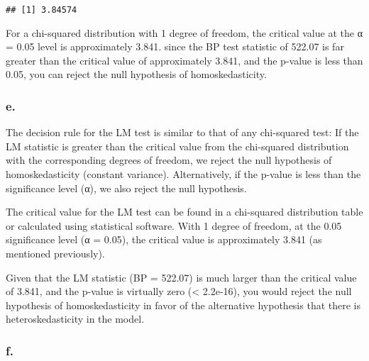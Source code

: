 \documentclass[
]{article}
\begin{document}
\begin{verbatim}
## [1] 3.84574
\end{verbatim}

For a chi-squared distribution with 1 degree of freedom, the critical
value at the α = 0.05 level is approximately 3.841. since the BP test
statistic of 522.07 is far greater than the critical value of
approximately 3.841, and the p-value is less than 0.05, you can reject
the null hypothesis of homoskedasticity.

\hypertarget{e.}{%
\subsubsection{e.}\label{e.}}

The decision rule for the LM test is similar to that of any chi-squared
test: If the LM statistic is greater than the critical value from the
chi-squared distribution with the corresponding degrees of freedom, we
reject the null hypothesis of homoskedasticity (constant variance).
Alternatively, if the p-value is less than the significance level (α),
we also reject the null hypothesis.

The critical value for the LM test can be found in a chi-squared
distribution table or calculated using statistical software. With 1
degree of freedom, at the 0.05 significance level (α = 0.05), the
critical value is approximately 3.841 (as mentioned previously).

Given that the LM statistic (BP = 522.07) is much larger than the
critical value of 3.841, and the p-value is virtually zero (\textless{}
2.2e-16), you would reject the null hypothesis of homoskedasticity in
favor of the alternative hypothesis that there is heteroskedasticity in
the model.

\hypertarget{f.}{%
\subsubsection{f.}\label{f.}}
\end{document}
